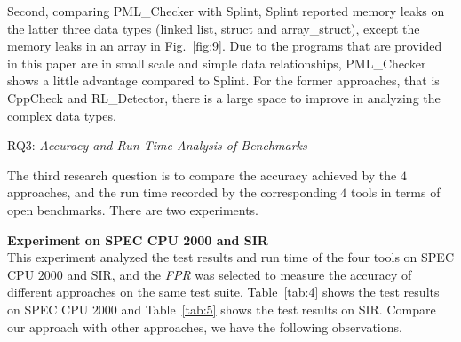 Second, comparing PML\_Checker with Splint, Splint reported memory leaks on the latter three data types (linked list, struct and array\_struct), except the memory leaks in an array in Fig.~\ref{fig:9}. Due to the programs that are provided in this paper are in small scale and simple data relationships, PML\_Checker shows a little advantage compared to Splint. For the former approaches, that is CppCheck and RL\_Detector, there is a large space to improve in analyzing the complex data types.

\noindent RQ3: \textit{Accuracy and Run Time Analysis of Benchmarks}

The third research question is to compare the accuracy achieved by the $4$ approaches, and the run time recorded by the corresponding $4$ tools in terms of open benchmarks. There are two experiments.

\noindent\textbf{Experiment on SPEC CPU 2000 and SIR} 
\\
This experiment analyzed the test results and run time of the four tools on SPEC CPU $2000$ and SIR, and the \textit{FPR} was selected to measure the accuracy of different approaches on the same test suite. Table~\ref{tab:4} shows the test results on SPEC CPU $2000$ and Table~\ref{tab:5} shows the test results on SIR. Compare our approach with other approaches, we have the following observations. 


